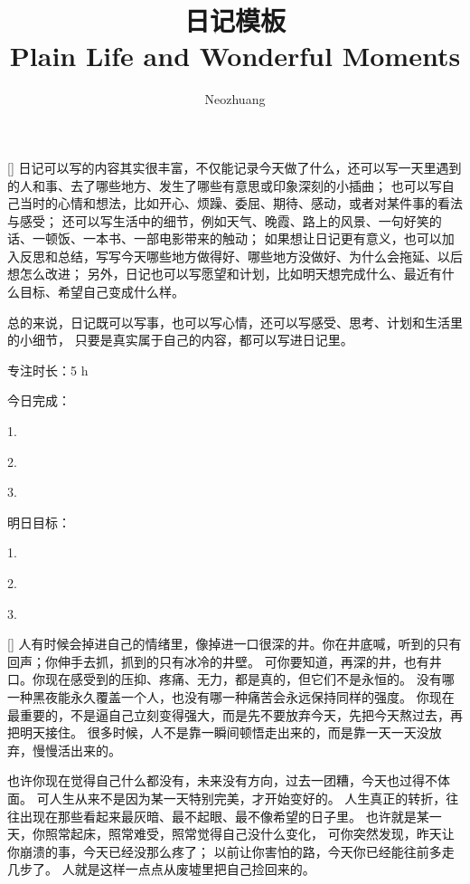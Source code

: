 \documentclass{diary}
\title{日记模板 \\{\small Plain Life and Wonderful Moments}}
\author{Neozhuang}
\begin{document}
\maketitle

\Address[中国][北京]
[\faSun]%
日记可以写的内容其实很丰富，不仅能记录今天做了什么，还可以写一天里遇到的人和事、去了哪些地方、发生了哪些有意思或印象深刻的小插曲；
也可以写自己当时的心情和想法，比如开心、烦躁、委屈、期待、感动，或者对某件事的看法与感受；
还可以写生活中的细节，例如天气、晚霞、路上的风景、一句好笑的话、一顿饭、一本书、一部电影带来的触动；
如果想让日记更有意义，也可以加入反思和总结，写写今天哪些地方做得好、哪些地方没做好、为什么会拖延、以后想怎么改进；
另外，日记也可以写愿望和计划，比如明天想完成什么、最近有什么目标、希望自己变成什么样。

总的来说，日记既可以写事，也可以写心情，还可以写感受、思考、计划和生活里的小细节，
只要是真实属于自己的内容，都可以写进日记里。

\Address[吴江][图书馆]
%
专注时长：5 h  \par
\quad \par
今日完成：\par
1.  \par
2.  \par
3.  \par
\quad \par
明日目标：\par
1. \par
2. \par
3. \par

\Address[吴江][盛泽]
[\faHeartCrack]%
人有时候会掉进自己的情绪里，像掉进一口很深的井。你在井底喊，听到的只有回声；你伸手去抓，抓到的只有冰冷的井壁。
可你要知道，再深的井，也有井口。你现在感受到的压抑、疼痛、无力，都是真的，但它们不是永恒的。
没有哪一种黑夜能永久覆盖一个人，也没有哪一种痛苦会永远保持同样的强度。
你现在最重要的，不是逼自己立刻变得强大，而是先不要放弃今天，先把今天熬过去，再把明天接住。
很多时候，人不是靠一瞬间顿悟走出来的，而是靠一天一天没放弃，慢慢活出来的。

也许你现在觉得自己什么都没有，未来没有方向，过去一团糟，今天也过得不体面。
可人生从来不是因为某一天特别完美，才开始变好的。
人生真正的转折，往往出现在那些看起来最灰暗、最不起眼、最不像希望的日子里。
也许就是某一天，你照常起床，照常难受，照常觉得自己没什么变化，
可你突然发现，昨天让你崩溃的事，今天已经没那么疼了；
以前让你害怕的路，今天你已经能往前多走几步了。
人就是这样一点点从废墟里把自己捡回来的。
\end{document}
